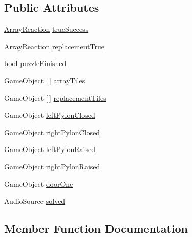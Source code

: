 \subsection*{Public Attributes}
\begin{DoxyCompactItemize}
\item 
\hyperlink{class_array_reaction}{Array\+Reaction} \hyperlink{class_logical_or_completion_ae5240c050cf760aca98a3466dfa3bd6a}{true\+Success}
\item 
\hyperlink{class_array_reaction}{Array\+Reaction} \hyperlink{class_logical_or_completion_aabb4ebdcb4e38046c43f6379d7c0b688}{replacement\+True}
\item 
bool \hyperlink{class_logical_or_completion_ad518cbefee91205d37240ba2dd7fdd19}{puzzle\+Finished}
\item 
Game\+Object \mbox{[}$\,$\mbox{]} \hyperlink{class_logical_or_completion_a5a9d2e3e6a922a095361ab66a2e1342e}{array\+Tiles}
\item 
Game\+Object \mbox{[}$\,$\mbox{]} \hyperlink{class_logical_or_completion_a4a8bfa05984877d32f5575d0bab00e1d}{replacement\+Tiles}
\item 
Game\+Object \hyperlink{class_logical_or_completion_a5618b9b7c564da318010746ba2a081d4}{left\+Pylon\+Closed}
\item 
Game\+Object \hyperlink{class_logical_or_completion_af7cfc7e6435c297479a2bcb47481ae59}{right\+Pylon\+Closed}
\item 
Game\+Object \hyperlink{class_logical_or_completion_adeb8fe88dd74a1b439ada910c58d0ae3}{left\+Pylon\+Raised}
\item 
Game\+Object \hyperlink{class_logical_or_completion_ae7398a003db47542eed166c249a78ee2}{right\+Pylon\+Raised}
\item 
Game\+Object \hyperlink{class_logical_or_completion_a0143c2b8f5eca58b7a3606c281381c9b}{door\+One}
\item 
Audio\+Source \hyperlink{class_logical_or_completion_a5c9e98e9b0cdfe29a2ed689a6d2da120}{solved}
\end{DoxyCompactItemize}


\subsection{Member Function Documentation}
\mbox{\label{class_logical_or_completion_af8cbd9a832c9c69ee46fb70020a7989b}} 
